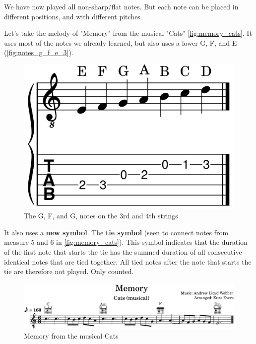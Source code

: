 \newpage

We have now played all non-sharp/flat notes. But each note can be placed in different positions, and with different pitches.

Let's take the melody of "Memory" from the musical "Cats" \autoref{fig:memory_cats}. It uses most of the notes we already learned, but also uses a lower G, F, and E (\autoref{fig:notes_g_f_e_3}).


\begin{figure}[h]
	\centering
	\includegraphics[height=0.12\textheight]{../../MuseScore/Guitar/NotesUsedInMemoryCats.png}
	\caption{The G, F, and G, notes on the 3rd and 4th strings}
	\label{fig:notes_g_f_e_3}
\end{figure}

It also uses a \textbf{new symbol}. The \textbf{tie symbol} (seen to connect notes from measure 5 and 6 in \autoref{fig:memory_cats}). This symbol indicates that the duration of the first note that starts the tie has the summed duration of all consecutive identical notes that are tied together. All tied notes after the note that starts the tie are therefore not played. Only counted.

\begin{figure}[h]
	\centering
	\includegraphics[width=\textwidth]{../../MuseScore/Guitar/GuitarMemoryCats.png}
	\caption{Memory from the musical Cats}
	\label{fig:memory_cats}
\end{figure}

